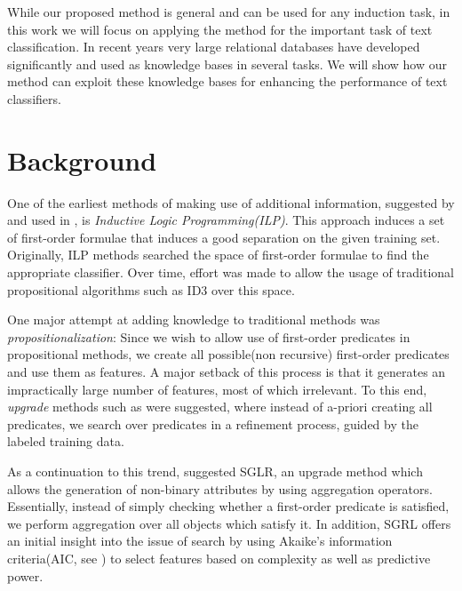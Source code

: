 \documentclass[12pt, a4paper]{article}
\theoremstyle{definition}
\begin{document}
While our proposed method is general and can be used for any induction task, in this work we will focus on applying the method for the important task of text classification. In recent years very large relational databases have developed significantly and used as knowledge bases in several tasks. We will show how our method can exploit these knowledge bases for enhancing the performance of text classifiers.


\section{Background} \label{background}


One of the earliest methods of making use of additional information, suggested by \citet{muggleton1991inductive} and used in \citet{quinlan1990learning}, is \emph{Inductive Logic Programming(ILP)}. This approach induces a set of first-order formulae
that induces a good separation on the given training set. Originally, ILP methods searched the space of first-order formulae to find the appropriate classifier.
Over time, effort was made to allow the usage of traditional propositional algorithms such as ID3\citep{quinlan1986} over this space.

One major attempt at adding knowledge to traditional methods was \emph{propositionalization}\citep{kramer2000bottom}: Since we wish to allow use of first-order predicates in propositional methods, we create all possible(non recursive) first-order predicates and use them as features.
A major setback of this process is that it generates an impractically large number of features, most of which irrelevant.  To this end, \emph{upgrade} methods such as \citet{van2001upgrade} were suggested, where instead of a-priori creating all predicates, we search over predicates in a refinement process, guided by the labeled training data.

As a continuation to this trend, \citet{popescul200716} suggested SGLR, an upgrade method which allows the generation of non-binary attributes by using aggregation operators. Essentially, instead of simply checking whether a first-order predicate is satisfied, we perform aggregation over all objects which satisfy it. In addition, SGRL offers an initial insight into the issue of search by using Akaike's information criteria(AIC, see \citet{burnham2002model}) to select features based on complexity as well as predictive power.
\end{document}
